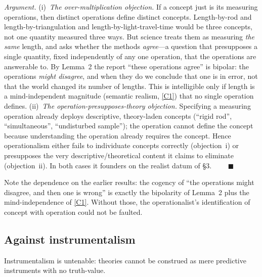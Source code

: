 \documentclass[12pt]{article}
\begin{document}
\noindent\emph{Argument.} (i)~\emph{The over-multiplication objection.}
If a concept just is its measuring operations, then distinct operations
define distinct concepts. Length-by-rod and length-by-triangulation and
length-by-light-travel-time would be three concepts, not one quantity
measured three ways. But science treats them as measuring \emph{the same}
length, and asks whether the methods \emph{agree}---a question that
presupposes a single quantity, fixed independently of any one operation,
that the operations are answerable to. By Lemma~2 the report ``these
operations agree'' is bipolar: the operations \emph{might disagree}, and
when they do we conclude that one is in error, not that the world changed
its number of lengths. This is intelligible only if length is a
mind-independent magnitude (semantic realism, \ref{C1}) that no single
operation defines. (ii)~\emph{The operation-presupposes-theory
objection.} Specifying a measuring operation already deploys descriptive,
theory-laden concepts (``rigid rod'', ``simultaneous'', ``undisturbed
sample''); the operation cannot define the concept because understanding
the operation already requires the concept. Hence operationalism either
fails to individuate concepts correctly (objection~i) or presupposes the
very descriptive/theoretical content it claims to eliminate
(objection~ii). In both cases it founders on the realist datum of \S3.
$\qquad\blacksquare$

Note the dependence on the earlier results: the cogency of ``the
operations might disagree, and then one is wrong'' is exactly the
bipolarity of Lemma~2 plus the mind-independence of \ref{C1}. Without
those, the operationalist's identification of concept with operation
could not be faulted.

\subsection{Against instrumentalism}

\begin{description}[leftmargin=1.6em,style=nextline]
\item[Claim 5.] Instrumentalism is untenable: theories cannot be
construed as mere predictive instruments with no truth-value.
\end{description}
\end{document}
